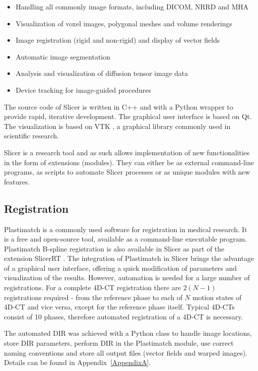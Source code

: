\begin{itemize}
	\item Handling all commonly image formats, including DICOM, NRRD and MHA
	\item Visualization of voxel images, polygonal meshes and volume renderings
	\item Image registration (rigid and non-rigid) and display of vector fields
	\item Automatic image segmentation
	\item Analysis and visualization of diffusion tensor image data
	\item Device tracking for image-guided procedures
\end{itemize}

The source code of Slicer is written in C++ and with a Python wrapper to provide rapid, iterative development. The graphical user interface is based on Qt. The visualization is based on VTK \cite{Vtk}, a graphical library commonly
used in scientific research.

Slicer is a research tool and as such allows implementation of new functionalities in the form of extensions (modules). They can either be as external command-line programs, 
as scripts to automate Slicer processes or as unique modules with new features. 

\subsection{Registration}
\label{RegistrationImplement}

Plastimatch \cite{Shackleford2010} is a commonly used software for registration in medical research. It is a free and open-source tool, available as a command-line executable program. 
Plastimatch B-spline registration is also available in Slicer as part of the extension SlicerRT \cite{Pinter2012}.
The integration of Plastimatch in Slicer brings the advantage of a graphical user interface, offering a quick modification of parameters and visualization of the results. 
However, automation is needed for a large number of registrations. For a complete 4D-CT registration there are $2(N-1)$ registrations required - from the reference phase to each of $N$ motion states of 4D-CT and vice versa, except for the reference phase itself. 
Typical 4D-CTs consist of 10 phases, therefore automated registration of a 4D-CT is necessary.

The automated DIR was achieved with a Python class to handle image locations, store DIR parameters, perform DIR in the Plastimatch module, use correct naming conventions and store all output files (vector fields and warped images). 
Details can be found in Appendix~\ref{AppendixA}.



